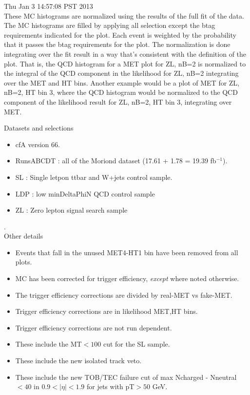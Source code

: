 \documentclass[11pt]{article}
\begin{document}
  Thu Jan  3 14:57:08 PST 2013 \\


  These MC histograms are normalized using the results of the full fit of the data.
  The MC histograms are filled by applying all selection except the btag requirements
  indicated for the plot.  Each event is weighted by the probability that it
  passes the btag requirements for the plot.
  The normalization is done integrating over the fit result in a way that's consistent
  with the definition of the plot.
  That is, the QCD histogram for a MET plot for ZL, nB=2 is normalized to the
  integral of the QCD component in the likelihood for ZL, nB=2 integrating
  over the MET and HT bins.
  Another example would be a plot of MET for ZL, nB=2, HT bin 3, where the
  QCD histogram would be normalized to the QCD component of the likelihood
  result for ZL, nB=2, HT bin 3, integrating over MET.

  \vspace{1cm}

   Datasets and selections
   \begin{itemize}
     \item cfA version 66.
     \item RunsABCDT : all of the Moriond dataset (17.61 + 1.78 = 19.39 fb$^{-1}$).
     \item SL : Single letpon ttbar and W+jets control sample.
     \item LDP : low minDeltaPhiN QCD control sample
     \item ZL : Zero lepton signal search sample
   \end{itemize}

.\\

   Other details
   \begin{itemize}
     \item Events that fall in the unused MET4-HT1 bin have been removed from all plots.
     \item MC has been corrected for trigger efficiency, {\it except} where noted otherwise.
     \item  The trigger efficiency corrections are divided by real-MET vs fake-MET.
     \item Trigger efficiency corrections are in likelihood MET,HT bins.
     \item Trigger efficiency corrections are not run dependent.
     \item These include the MT$<100$ cut for the SL sample.
     \item These include the new isolated track veto.
     \item These include the new TOB/TEC failure cut of max Ncharged - Nneutral $<40$ in $0.9<|\eta|<1.9$ for
             jets with pT$>50$ GeV.
   \end{itemize}
\end{document}
